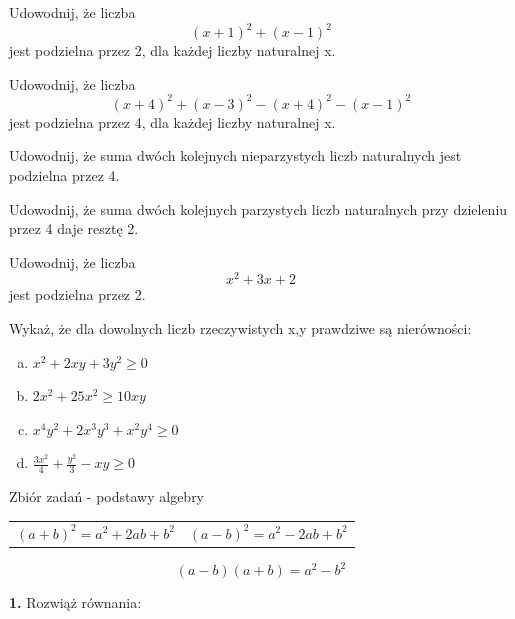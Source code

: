 \documentclass[12pt,a4paper]{article}
\theoremstyle{break}
\begin{document}
	\begin{zad}
		Udowodnij, że liczba
		$$(x+1)^2+(x-1)^2$$
		jest podzielna przez 2, dla każdej liczby naturalnej x.
	\end{zad}

	\begin{zad}
		Udowodnij, że liczba
		$$(x+4)^2+(x-3)^2-(x+4)^2-(x-1)^2$$
		jest podzielna przez 4, dla każdej liczby naturalnej x.
	\end{zad}

	\begin{zad}
		Udowodnij, że suma dwóch kolejnych nieparzystych liczb naturalnych jest podzielna przez 4.
	\end{zad}

	\begin{zad}
		Udowodnij, że suma dwóch kolejnych parzystych liczb naturalnych przy dzieleniu przez 4 daje resztę 2.
	\end{zad}

	\begin{zad}
	Udowodnij, że liczba
	$$x^2+3x+2$$
	jest podzielna przez 2.
	\end{zad}

	\begin{zad}
		Wykaż, że dla dowolnych liczb rzeczywistych x,y prawdziwe są nierówności:
	\end{zad}
	\begin{enumerate}[a)]
		\item $x^2+2xy+3y^2\geq 0$
		\item $2x^2+25x^2\geq 10xy$
		\item $x^4y^2+2x^3y^3+x^2y^4\geq0$
		\item $\frac{3x^2}{4}+\frac{y^2}{3}-xy\geq0$
	\end{enumerate}

	\newpage

	\begin{center}
	\LARGE Zbiór zadań - podstawy algebry
	\end{center}
	\begin{mdframed}[style=wzor]
		\begin{tabular}{p{7cm} p{7cm}}
			\centering$(a+b)^2=a^2+2ab+b^2$&
			\centering$(a-b)^2=a^2-2ab+b^2$\\
		\end{tabular}
		$$(a-b)(a+b)=a^2-b^2$$
	\end{mdframed}

	\begin{mdframed}[style=zad]
		\vspace{0.2cm}
		\textbf{1.} Rozwiąż równania: 
	\end{mdframed}
\end{document}
